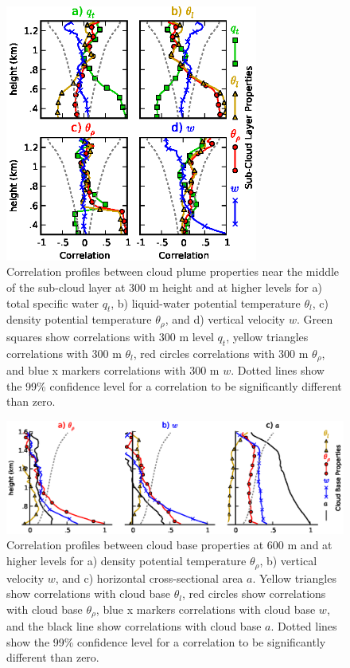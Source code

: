 \documentclass[acp]{copernicus}
\begin{document}
\begin{figure}[t]
\vspace*{2mm}
\begin{center}
\includegraphics[width=8.3cm]{./figures/sub_cloud_profiles}
\end{center}
\caption{Correlation profiles between cloud plume properties near the middle 
of the sub-cloud layer at 300 m height and at higher levels for a) total 
specific water $q_t$, b) liquid-water potential temperature $\theta_l$, 
c) density potential temperature $\theta_\rho$, and d) vertical velocity $w$. 
Green squares show correlations with 300 m level $q_t$, yellow triangles 
correlations with 300 m $\theta_l$, red circles correlations with 300 m 
$\theta_\rho$, and blue x markers correlations with 300 m $w$.  Dotted lines 
show the 99\% confidence level for a correlation to be significantly different 
than zero.}
\label{fig:sub_cloud_profiles}
\end{figure}

\begin{figure}[t]
\vspace*{2mm}
\begin{center}
\includegraphics[width=\textwidth]{./figures/cloud_base_profiles}
\end{center}
\caption{Correlation profiles between cloud base properties at 600 m and 
at higher levels for a) density potential temperature $\theta_\rho$, b) 
vertical velocity $w$, and c) horizontal cross-sectional area $a$.  Yellow 
triangles show correlations with cloud base $\theta_l$, red circles show 
correlations with cloud base $\theta_\rho$, blue x markers correlations with 
cloud base $w$, and the black line show correlations with cloud base $a$. 
Dotted lines show the 99\% confidence level for a correlation to be 
significantly different than zero.}
\label{fig:cloud_base_profiles}
\end{figure}
\end{document}
